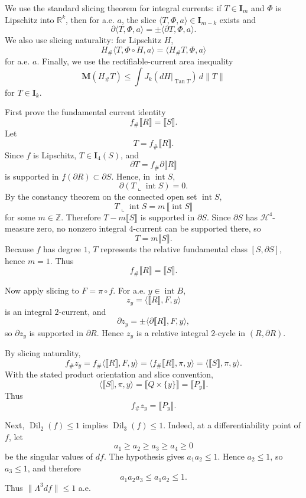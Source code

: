 We use the standard slicing theorem for integral currents: if \(T\in \mathbf I_m\) and \(\Phi\) is Lipschitz into \(\mathbb R^k\), then for a.e. \(a\), the slice \(\langle T,\Phi,a\rangle\in \mathbf I_{m-k}\) exists and
\[
\partial\langle T,\Phi,a\rangle
=
\pm \langle \partial T,\Phi,a\rangle.
\]
We also use slicing naturality: for Lipschitz \(H\),
\[
H_\#\langle T,\Phi\circ H,a\rangle
=
\langle H_\#T,\Phi,a\rangle
\]
for a.e. \(a\). Finally, we use the rectifiable-current area inequality
\[
\mathbf M(H_\#T)
\le
\int J_k(dH|_{\operatorname{Tan}T})\,d\|T\|
\]
for \(T\in\mathbf I_k\).

First prove the fundamental current identity
\[
f_\#\llbracket R\rrbracket=\llbracket S\rrbracket .
\]
Let
\[
T=f_\#\llbracket R\rrbracket.
\]
Since \(f\) is Lipschitz, \(T\in\mathbf I_4(S)\), and
\[
\partial T=f_\#\partial\llbracket R\rrbracket
\]
is supported in \(f(\partial R)\subset \partial S\). Hence, in \(\operatorname{int}S\),
\[
\partial(T\llcorner \operatorname{int}S)=0.
\]
By the constancy theorem on the connected open set \(\operatorname{int}S\),
\[
T\llcorner \operatorname{int}S
=
m\,\llbracket \operatorname{int}S\rrbracket
\]
for some \(m\in\mathbb Z\). Therefore \(T-m\llbracket S\rrbracket\) is supported in \(\partial S\). Since \(\partial S\) has \(\mathcal H^4\)-measure zero, no nonzero integral \(4\)-current can be supported there, so
\[
T=m\llbracket S\rrbracket.
\]
Because \(f\) has degree \(1\), \(T\) represents the relative fundamental class \([S,\partial S]\), hence \(m=1\). Thus
\[
f_\#\llbracket R\rrbracket=\llbracket S\rrbracket .
\]

Now apply slicing to \(F=\pi\circ f\). For a.e. \(y\in\operatorname{int}B\),
\[
z_y=\langle \llbracket R\rrbracket,F,y\rangle
\]
is an integral \(2\)-current, and
\[
\partial z_y
=
\pm \langle \partial\llbracket R\rrbracket,F,y\rangle,
\]
so \(\partial z_y\) is supported in \(\partial R\). Hence \(z_y\) is a relative integral \(2\)-cycle in \((R,\partial R)\).

By slicing naturality,
\[
f_\# z_y
=
f_\#\langle \llbracket R\rrbracket,F,y\rangle
=
\langle f_\#\llbracket R\rrbracket,\pi,y\rangle
=
\langle \llbracket S\rrbracket,\pi,y\rangle .
\]
With the stated product orientation and slice convention,
\[
\langle \llbracket S\rrbracket,\pi,y\rangle
=
\llbracket Q\times\{y\}\rrbracket
=
\llbracket P_y\rrbracket.
\]
Thus
\[
f_\#z_y=\llbracket P_y\rrbracket.
\]

Next, \(\operatorname{Dil}_2(f)\le 1\) implies \(\operatorname{Dil}_3(f)\le 1\). Indeed, at a differentiability point of \(f\), let
\[
a_1\ge a_2\ge a_3\ge a_4\ge 0
\]
be the singular values of \(df\). The hypothesis gives \(a_1a_2\le 1\). Hence \(a_2\le 1\), so \(a_3\le 1\), and therefore
\[
a_1a_2a_3\le a_1a_2\le 1.
\]
Thus \(\|\Lambda^3df\|\le 1\) a.e.

